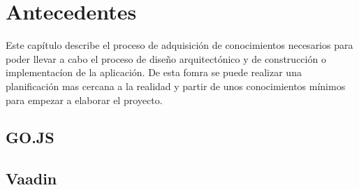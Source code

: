  \chapter{Antecedentes}

Este capítulo describe el proceso de adquisición de conocimientos necesarios para poder llevar a cabo el proceso de diseño arquitectónico y de construcción o implementacíon de la aplicación. De esta fomra se puede realizar una planificación mas cercana a la realidad y partir de unos conocimientos mínimos para empezar a elaborar el proyecto.
	
	 \minitoc
	
\section{GO.JS}

	


\section{Vaadin}
 		
 	
 			
	
	

	
	